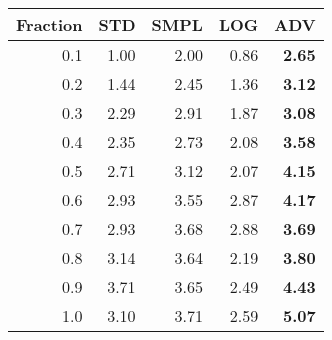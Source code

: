 \documentclass{standalone}
\begin{document}
\begin{tabular}{r|rrrr}
      \toprule
      Fraction & STD & SMPL & LOG & ADV\\
      \midrule
      0.1 & 1.00 & 2.00 & 0.86 & \textbf{2.65}\\
  0.2 & 1.44 & 2.45 & 1.36 & \textbf{3.12}\\
  0.3 & 2.29 & 2.91 & 1.87 & \textbf{3.08}\\
  0.4 & 2.35 & 2.73 & 2.08 & \textbf{3.58}\\
  0.5 & 2.71 & 3.12 & 2.07 & \textbf{4.15}\\
  0.6 & 2.93 & 3.55 & 2.87 & \textbf{4.17}\\
  0.7 & 2.93 & 3.68 & 2.88 & \textbf{3.69}\\
  0.8 & 3.14 & 3.64 & 2.19 & \textbf{3.80}\\
  0.9 & 3.71 & 3.65 & 2.49 & \textbf{4.43}\\
  1.0 & 3.10 & 3.71 & 2.59 & \textbf{5.07}\\
  \bottomrule
\end{tabular}
\end{document}
